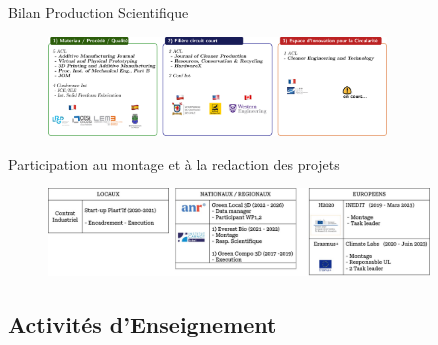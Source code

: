 \documentclass[
  11pt,
  ignorenonframetext,
  aspectratio=169,
  c]{beamer}
\begin{document}
\begin{frame}{Bilan Production Scientifique}
\begin{figure}

{\centering \includegraphics[width=0.8\textwidth,height=\textheight]{Figures/slides/Partners.png}

}

\end{figure}
\end{frame}

\begin{frame}{Participation au montage et à la redaction des projets}
\protect\hypertarget{participation-au-montage-et-uxe0-la-redaction-des-projets}{}
\begin{figure}

{\centering \includegraphics[width=0.9\textwidth,height=\textheight]{Figures/slides/Fabio-timeline-Projects.jpg}

}

\end{figure}
\end{frame}

\hypertarget{activituxe9s-denseignement}{%
\subsection{Activités d'Enseignement}\label{activituxe9s-denseignement}}
\end{document}
